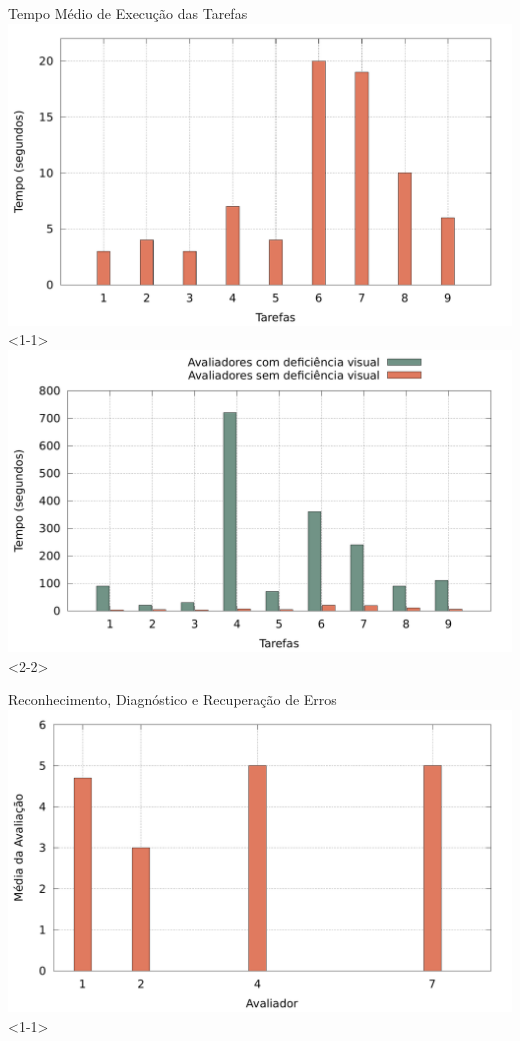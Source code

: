 \begin{frame}{Tempo Médio de Execução das Tarefas}
	\includegraphics[width=1\linewidth]{../charts/tempo-sem-dv.pdf}<1-1>
	\includegraphics[width=1\linewidth]{../charts/tempo.pdf}<2-2>
\end{frame}

\begin{frame}{Reconhecimento, Diagnóstico e Recuperação de Erros}
	\includegraphics[width=1\linewidth]{../charts/qt9.pdf}<1-1>
\end{frame}

